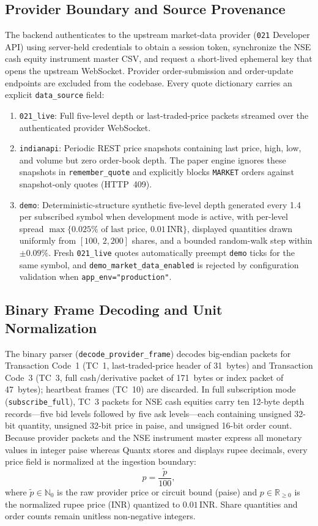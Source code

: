 \documentclass[12pt]{article}
\newcommand{\thinunit}[2]{#1\,\text{#2}}
\begin{document}
\subsection{Provider Boundary and Source Provenance}
The backend authenticates to the upstream market-data provider (\texttt{021} Developer API) using server-held credentials to obtain a session token, synchronize the NSE cash equity instrument master CSV, and request a short-lived ephemeral key that opens the upstream WebSocket. Provider order-submission and order-update endpoints are excluded from the codebase. Every quote dictionary carries an explicit \texttt{data\_source} field:
\begin{enumerate}
  \item \texttt{021\_live}: Full five-level depth or last-traded-price packets streamed over the authenticated provider WebSocket.
  \item \texttt{indianapi}: Periodic REST price snapshots containing last price, high, low, and volume but zero order-book depth. The paper engine ignores these snapshots in \texttt{remember\_quote} and explicitly blocks \texttt{MARKET} orders against snapshot-only quotes (HTTP~409).
  \item \texttt{demo}: Deterministic-structure synthetic five-level depth generated every \thinunit{1.4}{s} per subscribed symbol when development mode is active, with per-level spread $\max\{0.025\%\text{ of last price},\,\thinunit{0.01}{INR}\}$, displayed quantities drawn uniformly from $[100,\,2{,}200]$ shares, and a bounded random-walk step within $\pm 0.09\%$. Fresh \texttt{021\_live} quotes automatically preempt \texttt{demo} ticks for the same symbol, and \texttt{demo\_market\_data\_enabled} is rejected by configuration validation when \texttt{app\_env="production"}.
\end{enumerate}

\subsection{Binary Frame Decoding and Unit Normalization}
The binary parser (\texttt{decode\_provider\_frame}) decodes big-endian packets for Transaction Code~1 (TC~1, last-traded-price header of 31~bytes) and Transaction Code~3 (TC~3, full cash/derivative packet of 171~bytes or index packet of 47~bytes); heartbeat frames (TC~10) are discarded. In full subscription mode (\texttt{subscribe\_full}), TC~3 packets for NSE cash equities carry ten 12-byte depth records—five bid levels followed by five ask levels—each containing unsigned 32-bit quantity, unsigned 32-bit price in paise, and unsigned 16-bit order count. Because provider packets and the NSE instrument master express all monetary values in integer paise whereas Quantx stores and displays rupee decimals, every price field is normalized at the ingestion boundary:
\begin{equation}
p = \frac{\tilde{p}}{100},
\label{eq:paise}
\end{equation}
where $\tilde{p}\in\mathbb{N}_0$ is the raw provider price or circuit bound (paise) and $p\in\mathbb{R}_{\ge 0}$ is the normalized rupee price (INR) quantized to $\thinunit{0.01}{INR}$. Share quantities and order counts remain unitless non-negative integers.
\end{document}
